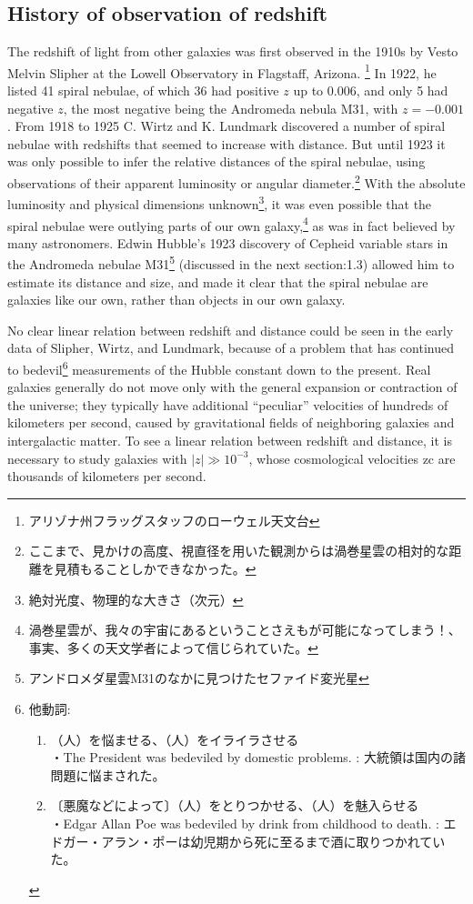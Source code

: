 \documentclass[11pt,a4paper,dvipdfmx]{jsarticle}
\theoremstyle{plain}
\theoremstyle{break}
\begin{document}
\subsection{History of observation of redshift}
The redshift of light from other galaxies was first observed in the 1910s by Vesto Melvin Slipher at the Lowell Observatory in Flagstaff, Arizona.
\footnote{アリゾナ州フラッグスタッフのローウェル天文台}
In 1922, he listed 41 spiral nebulae, of which 36 had positive $z$ up to 0.006, and only 5 had negative $z$, the most negative being the Andromeda nebula M31, with $z = -0.001$.
From 1918 to 1925 C. Wirtz and K. Lundmark discovered a number of spiral nebulae with redshifts that seemed to increase with distance.
But until 1923 it was only possible to infer the relative distances of the spiral nebulae, using observations of their apparent luminosity or angular diameter.\footnote{ここまで、見かけの高度、視直径を用いた観測からは渦巻星雲の相対的な距離を見積もることしかできなかった。}
With the absolute luminosity and physical dimensions unknown\footnote{絶対光度、物理的な大きさ（次元）}, it was even possible that the spiral nebulae were outlying parts of our own galaxy,\footnote{渦巻星雲が、我々の宇宙にあるということさえもが可能になってしまう！、事実、多くの天文学者によって信じられていた。} as was in fact believed by many astronomers.
Edwin Hubble’s 1923 discovery of Cepheid variable stars in the Andromeda nebulae M31\footnote{アンドロメダ星雲M31のなかに見つけたセファイド変光星}
 (discussed in the next section:1.3) allowed him to estimate its distance and size, and made it clear that the spiral nebulae are galaxies like our own, rather than objects in our own galaxy.

 No clear linear relation between redshift and distance could be seen in the early data of Slipher, Wirtz, and Lundmark, because of a problem that has continued to bedevil\footnote{他動詞:
\begin{enumerate}
  \item （人）を悩ませる、（人）をイライラさせる\\
  ・The President was bedeviled by domestic problems. : 大統領は国内の諸問題に悩まされた。
 \item〔悪魔などによって〕（人）をとりつかせる、（人）を魅入らせる\\
 ・Edgar Allan Poe was bedeviled by drink from childhood to death. : エドガー・アラン・ポーは幼児期から死に至るまで酒に取りつかれていた。
\end{enumerate}
} measurements of the Hubble constant down to the present.
Real galaxies generally do not move only with the general expansion or contraction of the universe; they typically have additional “peculiar” velocities of hundreds of kilometers per second, caused by gravitational fields of neighboring galaxies and intergalactic matter.
To see a linear relation between redshift and distance, it is necessary to study galaxies with $|z| \gg 10^{-3}$, whose cosmological velocities zc are thousands of kilometers per second.
\end{document}
